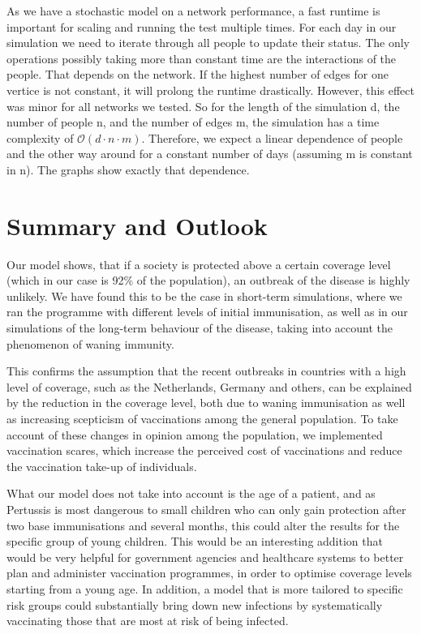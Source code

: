 \documentclass[11pt]{article}
\begin{document}
As we have a stochastic model on a network performance, a fast runtime is important for scaling and running the test multiple times. For each day in our simulation we need to iterate through all people to update their status. The only operations possibly taking more than constant time are the interactions of the people. That depends on the network. If the highest number of edges for one vertice is not constant, it will prolong the runtime drastically. However, this effect was minor for all networks we tested. So for the length of the simulation d, the number of people n, and the number of edges m, the simulation has a time complexity of $\mathcal{O}(d \cdot n \cdot m)$. Therefore, we expect a linear dependence of people and the other way around for a constant number of days (assuming m is constant in n). The graphs show exactly that dependence.



\section{Summary and Outlook}
Our model shows, that if a society is protected above a certain coverage level (which in our case is 92\% of the population), an outbreak of the disease is highly unlikely. 
We have found this to be the case in short-term simulations, where we ran the programme with different levels of initial immunisation, as well as in our simulations of the long-term behaviour of the disease, taking into account the phenomenon of waning immunity. 

This confirms the assumption that the recent outbreaks in countries with a high level of coverage, such as the Netherlands, Germany and others, can be explained by the reduction in the coverage level, both due to waning immunisation as well as increasing scepticism of vaccinations among the general population. 
To take account of these changes in opinion among the population, we implemented vaccination scares, which increase the perceived cost of vaccinations and reduce the vaccination take-up of individuals.   

What our model does not take into account is the age of a patient, and as Pertussis is most dangerous to small children who can only gain protection after two base immunisations and several months, this could alter the results for the specific group of young children. This would be an interesting addition that would be very helpful for government agencies and healthcare systems to better plan and administer vaccination programmes, in order to optimise coverage levels starting from a young age. In addition, a model that is more tailored to specific risk groups could substantially bring down new infections by systematically vaccinating those that are most at risk of being infected. 
\end{document}

